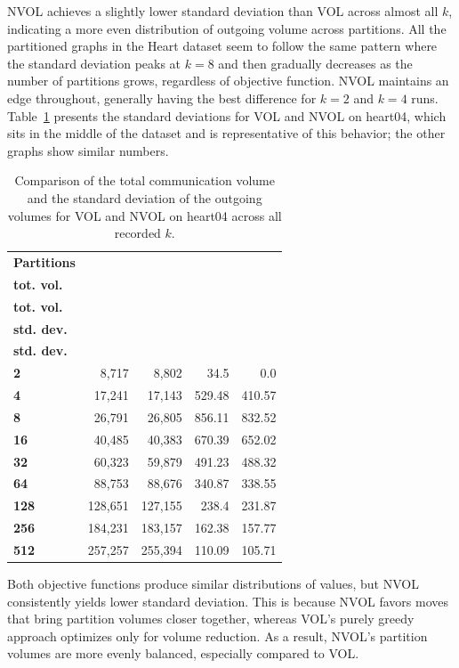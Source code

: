 NVOL achieves a slightly lower standard deviation than VOL across almost all $k$, indicating a more even distribution of outgoing volume across partitions. All the partitioned graphs in the Heart dataset seem to follow the same pattern where the standard deviation peaks at $k=8$ and then gradually decreases as the number of partitions grows, regardless of objective function. NVOL maintains an edge throughout, generally having the best difference for $k=2$ and $k=4$ runs. Table~\ref{tab:heart4_comparison} presents the standard deviations for VOL and NVOL on heart04, which sits in the middle of the dataset and is representative of this behavior; the other graphs show similar numbers.
\begin{table}[H]
	\centering
	\begin{tabular}{|l|r|r|r|r|}
		\hline
		\textbf{Partitions} 
		& \makecell{\textbf{VOL}\\\textbf{tot. vol.}}
		& \makecell{\textbf{NVOL}\\\textbf{tot. vol.}}
		& \makecell{\textbf{VOL}\\\textbf{std. dev.}}
		& \makecell{\textbf{NVOL}\\\textbf{std. dev.}}\\
		\hline
		\textbf{2} & 8,717 & 8,802 & 34.5 & 0.0\\
		\hline
		\textbf{4} & 17,241 & 17,143 & 529.48 & 410.57\\
		\hline
		\textbf{8} & 26,791 & 26,805 & 856.11 & 832.52\\
		\hline
		\textbf{16} & 40,485 & 40,383 & 670.39 & 652.02\\
		\hline
		\textbf{32} & 60,323 & 59,879 & 491.23 & 488.32\\
		\hline
		\textbf{64} & 88,753 & 88,676 & 340.87 & 338.55\\
		\hline
		\textbf{128} & 128,651 & 127,155 & 238.4 & 231.87\\
		\hline
		\textbf{256} & 184,231 & 183,157 & 162.38 & 157.77\\
		\hline
		\textbf{512} & 257,257 & 255,394 & 110.09 & 105.71\\
		\hline
	\end{tabular}
	\caption{Comparison of the total communication volume and the standard deviation of the outgoing volumes for VOL and NVOL on heart04 across all recorded $k$.}
	\label{tab:heart4_comparison}
\end{table}
Both objective functions produce similar distributions of values, but NVOL consistently yields lower standard deviation. This is because NVOL favors moves that bring partition volumes closer together, whereas VOL's purely greedy approach optimizes only for volume reduction. As a result, NVOL's partition volumes are more evenly balanced, especially compared to VOL.

